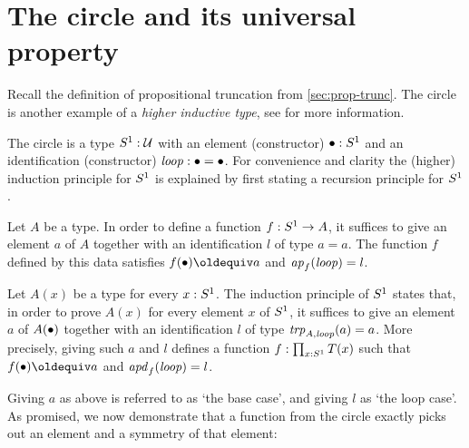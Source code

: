 \section{The circle and its universal property}
\label{sec:S1}

Recall the definition of propositional truncation from \cref{sec:prop-trunc}.
The circle is another example of a \emph{higher inductive type},
see \cite[Ch. 6]{hottbook} for more information.

\begin{definition}
  \label{def:circle}
The circle is a type $S^1:\mathcal{U}$ with an element (constructor) $\bullet : S^1$ and 
an identification (constructor) $\mathit{loop}: \bullet=\bullet$. For convenience and
clarity the (higher) induction principle for $S^1$ is explained
by first stating a recursion principle for $S^1$.

Let $A$ be a type. In order to define a function $f:S^1\to A$,
it suffices to give an element $a$ of $A$ together with an
identification $l$ of type $a=a$. The function $f$ defined
by this data satisfies $f(\base)\jdeq a$ and $\mathop{{\it ap}_{f}}(\mathit{loop})=l$.

Let $A(x)$ be a type for every $x:S^1$. The induction principle of $S^1$
states that, in order to prove $A(x)$ for every element $x$ of $S^1$,
it suffices to give an element $a$ of $A(\bullet)$ together with an
identification $l$ of type $\mathord{\mathit{trp}}_{A,\mathit{loop}}(a) = a$. More precisely,
giving such $a$ and $l$ defines a function $f:\prod_{x:S^1}T(x)$ such that
$f(\base)\jdeq a$ and $\mathop{{\it apd}_{f}}(\mathit{loop})=l$. 
\end{definition}

Giving $a$ as above is referred to as `the base case', and
giving $l$ as `the loop case'.
As promised, we now demonstrate that a function from the circle exactly 
picks out an element and a symmetry of that element:

